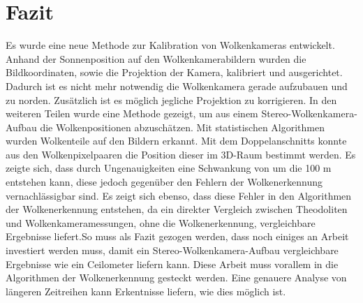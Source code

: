 \documentclass[a4paper,11pt,twoside,german]{article}
\newcommand{\absatz}{\smallbreak}
\newcommand{\literaturverzeichnis}[1]{
    \renewcommand{\harvardand}{und} %
    
    }
\begin{document}


\section{Fazit} Es wurde eine neue Methode zur Kalibration von Wolkenkameras
entwickelt. Anhand der Sonnenposition auf den Wolkenkamerabildern wurden die
Bildkoordinaten, sowie die Projektion der Kamera, kalibriert und ausgerichtet.
Dadurch ist es nicht mehr notwendig die Wolkenkamera gerade aufzubauen und zu
norden. Zusätzlich ist es möglich jegliche Projektion zu korrigieren. In den
weiteren Teilen wurde eine Methode gezeigt, um aus einem
Stereo-Wolkenkamera-Aufbau die Wolkenpositionen abzuschätzen. Mit statistischen
Algorithmen wurden Wolkenteile auf den Bildern erkannt. Mit dem Doppelanschnitts
konnte aus den Wolkenpixelpaaren die Position dieser im 3D-Raum bestimmt werden.
Es zeigte sich, dass durch Ungenauigkeiten eine Schwankung von um die 100 m
entstehen kann, diese jedoch gegenüber den Fehlern der Wolkenerkennung
vernachlässigbar sind. Es zeigt sich ebenso, dass diese Fehler in den
Algorithmen der Wolkenerkennung entstehen, da ein direkter Vergleich zwischen
Theodoliten und Wolkenkameramessungen, ohne die Wolkenerkennung, vergleichbare
Ergebnisse liefert.\absatz So muss als Fazit gezogen werden, dass noch einiges
an Arbeit investiert werden muss, damit ein Stereo-Wolkenkamera-Aufbau
vergleichbare Ergebnisse wie ein Ceilometer liefern kann. Diese Arbeit muss
vorallem in die Algorithmen der Wolkenerkennung gesteckt werden. Eine genauere
Analyse von längeren Zeitreihen kann Erkentnisse liefern, wie dies möglich ist.



\literaturverzeichnis{bibliography} %
\end{document}
